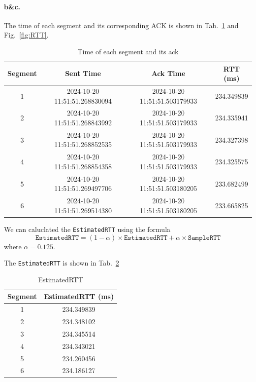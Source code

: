 \documentclass{cshwk}
\begin{document}
\paragraph{b\&c.} The time of each segment and its corresponding ACK is shown in Tab.~\ref{tab:time} and Fig.~\ref{fig:RTT}.


\begin{table}[htbp]
    \centering
    \caption{Time of each segment and its ack}
    \label{tab:time}
    \begin{tabular}{cccc}
        \toprule
        Segment & Sent Time                     & Ack Time                      & RTT (ms)   \\
        \midrule
        1       & 2024-10-20 11:51:51.268830094 & 2024-10-20 11:51:51.503179933 & 234.349839 \\
        2       & 2024-10-20 11:51:51.268843992 & 2024-10-20 11:51:51.503179933 & 234.335941 \\
        3       & 2024-10-20 11:51:51.268852535 & 2024-10-20 11:51:51.503179933 & 234.327398 \\
        4       & 2024-10-20 11:51:51.268854358 & 2024-10-20 11:51:51.503179933 & 234.325575 \\
        5       & 2024-10-20 11:51:51.269497706 & 2024-10-20 11:51:51.503180205 & 233.682499 \\
        6       & 2024-10-20 11:51:51.269514380 & 2024-10-20 11:51:51.503180205 & 233.665825 \\
        \bottomrule
    \end{tabular}
\end{table}

We can caluclated the \texttt{EstimatedRTT} using the formula
\[
    \texttt{EstimatedRTT} = (1 - \alpha) \times \texttt{EstimatedRTT} + \alpha \times \texttt{SampleRTT}
\]
where $\alpha = 0.125$.

The \texttt{EstimatedRTT} is shown in Tab.~\ref{tab:EstimatedRTT}

\begin{table}[htbp]
    \centering
    \caption{EstimatedRTT}
    \label{tab:EstimatedRTT}
    \begin{tabular}{cc}
        \toprule
        Segment & EstimatedRTT (ms) \\
        \midrule
        1       & 234.349839        \\
        2       & 234.348102        \\
        3       & 234.345514        \\
        4       & 234.343021        \\
        5       & 234.260456        \\
        6       & 234.186127        \\
        \bottomrule
    \end{tabular}
\end{table}
\end{document}
